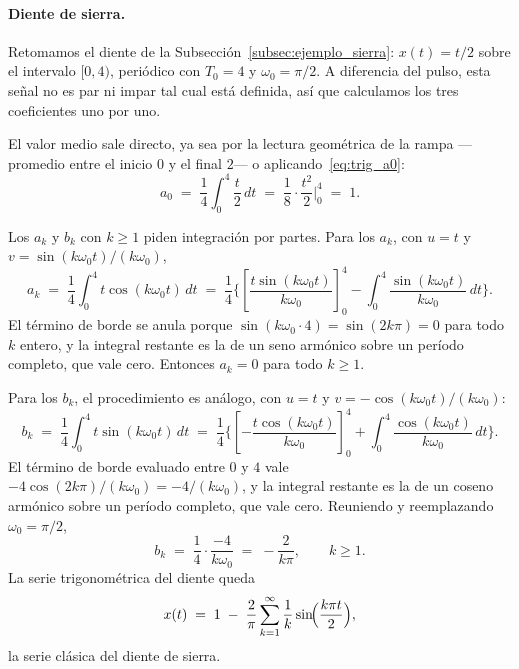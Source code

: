 \documentclass[class=book, crop=false]{standalone}
\begin{document}
\paragraph{Diente de sierra.}
Retomamos el diente de la
Subsección~\ref{subsec:ejemplo_sierra}: $x(t) = t/2$ sobre el
intervalo $[0, 4)$, periódico con $T_0 = 4$ y $\omega_0 = \pi/2$. A
diferencia del pulso, esta señal no es par ni impar tal cual está
definida, así que calculamos los tres coeficientes uno por uno.

El valor medio sale directo, ya sea por la lectura geométrica de la
rampa ---promedio entre el inicio $0$ y el final $2$--- o
aplicando~\eqref{eq:trig_a0}:
\begin{equation*}
    a_0 \;=\; \frac{1}{4}\int_0^4 \frac{t}{2}\,dt
        \;=\; \frac{1}{8}\cdot\frac{t^2}{2}\bigg|_0^4
        \;=\; 1.
\end{equation*}

Los $a_k$ y $b_k$ con $k\geq 1$ piden integración por partes. Para
los $a_k$, con $u = t$ y $v = \sin(k\omega_0 t)/(k\omega_0)$,
\begin{equation*}
    a_k \;=\; \frac{1}{4}\int_0^4 t\cos(k\omega_0 t)\,dt
        \;=\; \frac{1}{4}\Biggl\{
            \left[\frac{t\sin(k\omega_0 t)}{k\omega_0}\right]_0^4
            - \int_0^4 \frac{\sin(k\omega_0 t)}{k\omega_0}\,dt
            \Biggr\}.
\end{equation*}
El término de borde se anula porque
$\sin(k\omega_0\cdot 4) = \sin(2k\pi) = 0$ para todo $k$ entero, y
la integral restante es la de un seno armónico sobre un período
completo, que vale cero. Entonces $a_k = 0$ para todo $k\geq 1$.

Para los $b_k$, el procedimiento es análogo, con $u = t$ y
$v = -\cos(k\omega_0 t)/(k\omega_0)$:
\begin{equation*}
    b_k \;=\; \frac{1}{4}\int_0^4 t\sin(k\omega_0 t)\,dt
        \;=\; \frac{1}{4}\Biggl\{
            \left[-\frac{t\cos(k\omega_0 t)}{k\omega_0}\right]_0^4
            + \int_0^4 \frac{\cos(k\omega_0 t)}{k\omega_0}\,dt
            \Biggr\}.
\end{equation*}
El término de borde evaluado entre $0$ y $4$ vale
$-4\cos(2k\pi)/(k\omega_0) = -4/(k\omega_0)$, y la integral restante
es la de un coseno armónico sobre un período completo, que vale
cero. Reuniendo y reemplazando $\omega_0 = \pi/2$,
\begin{equation}
    b_k \;=\; \frac{1}{4}\cdot\frac{-4}{k\omega_0}
        \;=\; -\frac{2}{k\pi}, \qquad k\geq 1.
    \label{eq:bk_sierra}
\end{equation}
La serie trigonométrica del diente queda
\begin{equation*}
    x(t) \;=\; 1 \;-\; \frac{2}{\pi}\sum_{k=1}^{\infty}
        \frac{1}{k}\sin\!\Bigl(\frac{k\pi t}{2}\Bigr),
\end{equation*}
la serie clásica del diente de sierra.
\end{document}
